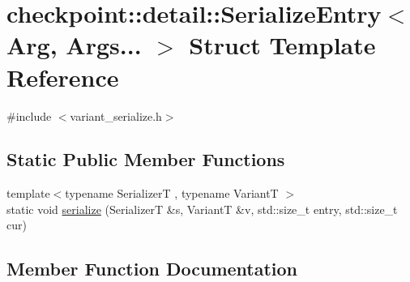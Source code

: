 \hypertarget{structcheckpoint_1_1detail_1_1_serialize_entry_3_01_arg_00_01_args_8_8_8_01_4}{}\section{checkpoint\+:\+:detail\+:\+:Serialize\+Entry$<$ Arg, Args... $>$ Struct Template Reference}
\label{structcheckpoint_1_1detail_1_1_serialize_entry_3_01_arg_00_01_args_8_8_8_01_4}


{\ttfamily \#include $<$variant\+\_\+serialize.\+h$>$}

\subsection*{Static Public Member Functions}
\begin{DoxyCompactItemize}
\item 
{\footnotesize template$<$typename SerializerT , typename VariantT $>$ }\\static void \hyperlink{structcheckpoint_1_1detail_1_1_serialize_entry_3_01_arg_00_01_args_8_8_8_01_4_a083d7c25acdf03d051c28d7503fe8b59}{serialize} (SerializerT \&s, VariantT \&v, std\+::size\+\_\+t entry, std\+::size\+\_\+t cur)
\end{DoxyCompactItemize}


\subsection{Member Function Documentation}
\mbox{\label{structcheckpoint_1_1detail_1_1_serialize_entry_3_01_arg_00_01_args_8_8_8_01_4_a083d7c25acdf03d051c28d7503fe8b59}} 
